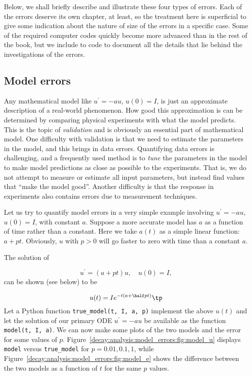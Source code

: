 \documentclass[graybox,sectrefs,envcountresetchap,open=right,final]{svmonodo}
\begin{document}
\noindent
Below, we shall briefly describe and illustrate these four types
of errors. Each of the errors deserve its own chapter, at least,
so the treatment here is superficial to give some indication
about the nature of size of the errors in a specific case.
Some of the required computer codes quickly become more advanced
than in the rest of the book, but we include to code to document
all the details that lie behind the investigations of the errors.

\subsection{Model errors}

Any mathematical model like $u^{\prime}=-au$, $u(0)=I$, is just an
approximate description of a real-world phenomenon. How good this
approximation is can be determined by comparing physical experiments
with what the model predicts. This is the topic of \emph{validation} and is
obviously an essential part of mathematical model. One difficulty with
validation is that we need to estimate the parameters in the model, and
this brings in data errors. Quantifying data errors is challenging,
and a frequently used method is to \emph{tune} the parameters in the model
to make model predictions as close as possible to the experiments.
That is, we do not attempt to measure or estimate all input
parameters, but instead find values that ``make the model good''.
Another difficulty is that the response in experiments also contains
errors due to measurement techniques.

Let us try to quantify model errors in a very simple example involving
$u^{\prime}=-au$, $u(0)=I$, with constant $a$.  Suppose a more
accurate model has $a$ as a function of time rather than a
constant. Here we take $a(t)$ as a simple linear function: $a +
pt$. Obviously, $u$ with $p>0$ will go faster to zero with time than a
constant $a$.

The solution of

\[ u^{\prime} = (a + pt)u,\quad u(0)=I,\]
can be shown (see below) to be

\[ u(t) = I e^{-t \left(a + \half pt\right)}\tp\]
Let a Python function \Verb!true_model(t, I, a, p)! implement the
above $u(t)$ and let
the solution of our primary ODE $u^{\prime}=-au$ be available as
the function \texttt{model(t, I, a)}.
We can now make some plots of the two models and the error for some values
of $p$. Figure~\ref{decay:analysis:model_errors:fig:model_u} displays
\texttt{model} versus \Verb!true_model! for $p=0.01, 0.1, 1$, while Figure~\ref{decay:analysis:model_errors:fig:model_e} shows the difference
between the two models as a function of $t$ for the same $p$ values.
\end{document}
